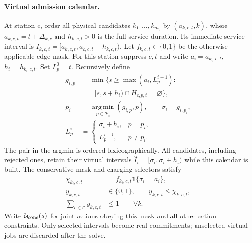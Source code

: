 \paragraph{Virtual admission calendar.}
At station $c$, order all physical candidates
$k_1,\ldots,k_{m_c}$ by $(a_{k,c,t},k)$, where
$a_{k,c,t}=t+\Delta_{k,c}$ and $h_{k,c,t}>0$ is the full service duration.
Its immediate-service interval is
$I_{k,c,t}=[a_{k,c,t},a_{k,c,t}+h_{k,c,t})$.
Let $f_{k,c,t}\in\{0,1\}$ be the otherwise-applicable edge mask.
For this station suppress $c,t$ and write $a_i=a_{k_i,c,t}$,
$h_i=h_{k_i,c,t}$. Set $L_p^0=t$. Recursively define
\begin{equation}
\begin{aligned}
g_{i,p}&=\min\{s\ge\max(a_i,L_p^{i-1}):\\[-2pt]
&\qquad[s,s+h_i)\cap H_{c,p,t}=\varnothing\},\\
p_i&=\operatorname*{arg\,min}_{p\in\mathcal P_c}(g_{i,p},p),
\qquad \sigma_i=g_{i,p_i},\\
L_p^i&=\begin{cases}\sigma_i+h_i,&p=p_i,\\
                         L_p^{i-1},&p\ne p_i.
          \end{cases}
\end{aligned}
\label{eq:conservative_virtual_recursion}
\end{equation}
The pair in the argmin is ordered lexicographically. All candidates,
including rejected ones, retain their virtual intervals
$\widehat I_i=[\sigma_i,\sigma_i+h_i)$ while this calendar is built.
The conservative mask and charging selectors satisfy
\begin{equation}
\begin{aligned}
\chi_{k_i,c,t}&=f_{k_i,c,t}\mathbf1\{\sigma_i=a_i\},\\
y_{k,c,t}&\in\{0,1\},\qquad y_{k,c,t}\le\chi_{k,c,t},\\
\sum_{c\in\mathcal C}y_{k,c,t}&\le1\qquad\forall k.
\end{aligned}
\label{eq:conservative_mask}
\end{equation}
Write $\mathcal U_{\rm cons}(s)$ for joint actions obeying this mask
and all other action constraints. Only selected intervals become real
commitments; unselected virtual jobs are discarded after the solve.

